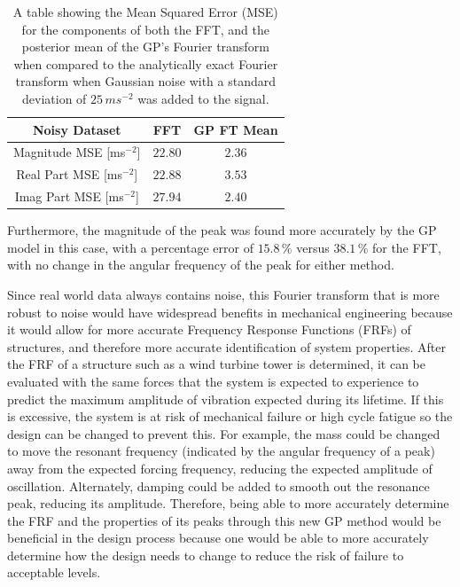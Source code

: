 \documentclass[12pt]{article}
\begin{document}
    \begin{table}[ht!]
        \centering %
        \setlength{\arrayrulewidth}{1pt} %
        \begin{tabular}{|c|c|c|} %
            \hline
            Noisy Dataset & FFT & GP FT Mean \\ %
            \hline
            Magnitude MSE [ms$^{-2}$] & $22.80$ & $2.36$ \\
            \hline
            Real Part MSE [ms$^{-2}$] & $22.88$ & $3.53$ \\
            \hline
            Imag Part MSE [ms$^{-2}$] & $27.94$ & $2.40$ \\
            \hline
        \end{tabular}
        \caption{A table showing the Mean Squared Error (MSE) for the components of both the FFT, and the posterior mean of the GP's Fourier transform when compared to the analytically exact Fourier transform when Gaussian noise with a standard deviation of $25 \, ms^{-2}$ was added to the signal.}
        \label{tab:response-noise}
    \end{table}

    Furthermore, the magnitude of the peak was found more accurately by the GP model in this case, with a percentage error of $15.8 \, \%$ versus $38.1 \, \%$ for the FFT, with no change in the angular frequency of the peak for either method.

    Since real world data always contains noise, this Fourier transform that is more robust to noise would have widespread benefits in mechanical engineering because it would allow for more accurate Frequency Response Functions (FRFs) of structures, and therefore more accurate identification of system properties.
    After the FRF of a structure such as a wind turbine tower is determined, it can be evaluated with the same forces that the system is expected to experience to predict the maximum amplitude of vibration expected during its lifetime.
    If this is excessive, the system is at risk of mechanical failure or high cycle fatigue so the design can be changed to prevent this.
    For example, the mass could be changed to move the resonant frequency (indicated by the angular frequency of a peak) away from the expected forcing frequency, reducing the expected amplitude of oscillation.
    Alternately, damping could be added to smooth out the resonance peak, reducing its amplitude.
    Therefore, being able to more accurately determine the FRF and the properties of its peaks through this new GP method would be beneficial in the design process because one would be able to more accurately determine how the design needs to change to reduce the risk of failure to acceptable levels.
\end{document}
